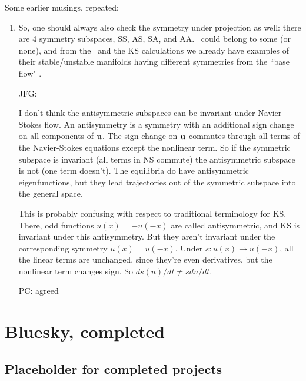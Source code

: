 Some earlier musings, repeated:
\begin{enumerate}
  \item
So, one should always also check the symmetry under
projection as well: there are 4 symmetry subspaces,
SS, AS, SA, and AA.
\Eqva\ could belong to some (or none), and from the \ubranch\ and the KS
calculations
we already have examples of their stable/unstable manifolds
having different symmetries from the ``base flow" \eqv.

JFG:{
I don't think the antisymmetric subspaces can be invariant under
Navier-Stokes flow. An antisymmetry is a symmetry with an additional
sign change on all components of ${\bf u}$. The sign change on ${\bf u}$ commutes
through all terms of the Navier-Stokes equations except the nonlinear term.
So if the symmetric subspace is invariant (all terms in NS commute) the
antisymmetric subspace is not (one term doesn't). The equilibria do have
antisymmetric eigenfunctions, but they lead trajectories out of the
symmetric subspace into the general space.

  This is probably confusing with respect to traditional terminology for
KS. There, odd functions $u(x) = -u(-x)$ are called antisymmetric, and KS is
invariant under this antisymmetry. But they aren't invariant under the
corresponding symmetry $u(x) = u(-x)$. Under
$s : u(x) \to u(-x)$, all the linear terms are unchanged, since they're even
derivatives, but the nonlinear term changes sign. So $d s(u)/dt \neq s du/dt$.


PC: agreed
}
\end{enumerate}


\section{Bluesky, completed}

\subsection{Placeholder for completed projects}
